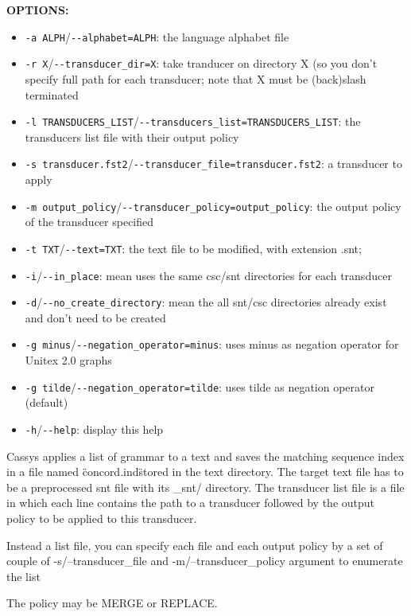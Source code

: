 \bigskip
\noindent \textbf{OPTIONS:}
\begin{itemize}
  \item \verb+-a ALPH+/\verb+--alphabet=ALPH+: the language alphabet file
  \item \verb+-r X+/\verb+--transducer_dir=X+: take tranducer on directory X (so you don't specify full path for each transducer; note that X must be (back)slash terminated
	\item \verb+-l TRANSDUCERS_LIST+/\verb+--transducers_list=TRANSDUCERS_LIST+: the transducers list file with their output policy
	\item \verb+-s transducer.fst2+/\verb+--transducer_file=transducer.fst2+: a transducer to apply
	\item \verb+-m output_policy+/\verb+--transducer_policy=output_policy+: the output policy of the transducer specified
  \item \verb+-t TXT+/\verb+--text=TXT+: the text file to be modified, with extension .snt;
	\item \verb+-i+/\verb+--in_place+: mean uses the same csc/snt directories for each transducer
	\item \verb+-d+/\verb+--no_create_directory+: mean the all snt/csc directories already exist and don't need to be created
	\item \verb+-g minus+/\verb+--negation_operator=minus+: uses minus as negation operator for Unitex 2.0 graphs
	\item \verb+-g tilde+/\verb+--negation_operator=tilde+: uses tilde as negation operator (default)
	\item \verb+-h+/\verb+--help+: display this help
\end{itemize} 	

\bigskip
\noindent Cassys applies a list of grammar to a text and saves the matching sequence index in a file named \"concord.ind\" stored in the text directory.
      The target text file has to be a preprocessed snt file with its \_snt/ directory. 
      The transducer list file is a file in which each line contains the path to a transducer followed by the output policy to be applied to this transducer.

\bigskip
\noindent Instead a list file, you can specify each file and each output policy by a set of couple of -s/--transducer\_file 
      and -m/--transducer\_policy argument to enumerate the list
      
\bigskip
\noindent The policy may be MERGE or REPLACE.
      
